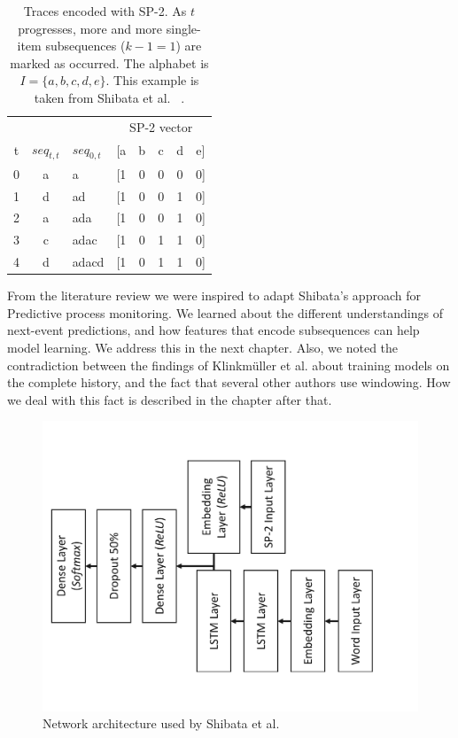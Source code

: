 \begin{table}[!htb]
    \centering
    \begin{tabular}{cclccccc}
          &      &              & \multicolumn{5}{c}{SP-2 vector}\\
        t & $seq_{t, t}$ & $seq_{0,t}$ & [a & b & c & d & e]\\
        \midrule
        0 & a    & a            & [1 & 0 & 0 & 0 & 0]\\
        1 & d    & ad           & [1 & 0 & 0 & 1 & 0]\\
        2 & a    & ada          & [1 & 0 & 0 & 1 & 0]\\
        3 & c    & adac         & [1 & 0 & 1 & 1 & 0]\\
        4 & d    & adacd        & [1 & 0 & 1 & 1 & 0]\\
    \end{tabular}
    \caption[SP-2 feature vector example]{Traces encoded with SP-2. As $t$ progresses, more and more single-item subsequences ($k-1=1$) are marked as occurred. The alphabet is $I=\{a,b,c,d,e\}$. This example is taken from Shibata et al. ~\cite{shibata2016bipartite}.}
    \label{tab:sp2-encoding}
\end{table}


From the literature review we were inspired to adapt Shibata's approach for Predictive process monitoring.
We learned about the different understandings of next-event predictions, and how
features that encode subsequences can help model learning. We address this in the next chapter.
Also, we noted the contradiction between the findings of Klinkmüller et al. about training models on the complete history, and the fact that several other authors use windowing.
How we deal with this fact is described in the chapter after that.

\begin{figure}
    \centering
    \includegraphics[width=.8\textwidth,angle=-90,origin=c]{gfx/spice-winner-architecture.pdf}
    \caption{Network architecture used by Shibata et al.}
    \label{fig:spice-winner-architecture}
\end{figure}

